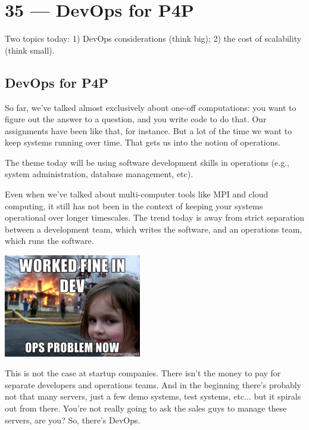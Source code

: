 \documentclass[a4paper]{report}
\begin{document}
\chapter*{35 --- DevOps for P4P}


Two topics today: 1) DevOps considerations (think
big); 2) the cost of scalability (think small).

\section*{DevOps for P4P}
So far, we've talked almost exclusively about one-off computations:
you want to figure out the answer to a question, and you write code to
do that. Our assignments have been like that, for instance. But a lot
of the time we want to keep systems running over time. That gets us
into the notion of operations. 

The theme today will be using software development skills in
operations (e.g., system administration, database management, etc).

Even when we've talked about multi-computer tools like MPI and cloud
computing, it still has not been in the context of keeping your
systems operational over longer timescales. The trend today is away
from strict separation between a development team, which writes the
software, and an operations team, which runs the software.

\begin{center}
	\includegraphics[width=0.45\textwidth]{images/devops.jpg}
\end{center}

This is not the case at startup companies. There isn't the money to pay for separate developers and operations teams. And in the beginning there's probably not that many servers, just a few demo systems, test systems, etc... but it spirals out from there. You're not really going to ask the sales guys to manage these servers, are you? So, there's DevOps. 
\end{document}
